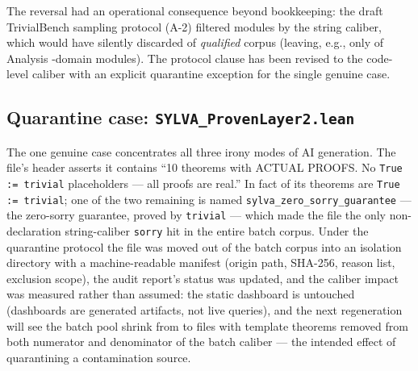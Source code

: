 The reversal had an operational consequence beyond bookkeeping: the
draft TrivialBench sampling protocol (A-2) filtered modules by the
string caliber, which would have silently discarded  of
\emph{qualified} corpus (leaving, e.g., only  of Analysis
-domain modules).
The protocol clause has been revised to the code-level caliber with
an explicit quarantine exception for the single genuine case.

\subsection{Quarantine case: \texttt{SYLVA\_ProvenLayer2.lean}}
\label{sec:quarantine}
The one genuine case concentrates all three irony modes of AI
generation. The file's header asserts it contains ``10 theorems with
ACTUAL PROOFS. No \texttt{True := trivial} placeholders --- all proofs
are real.'' In fact  of its  theorems are
\texttt{True := trivial}; one of the two remaining is named
\texttt{sylva\_zero\_sorry\_guarantee} --- the zero-sorry guarantee,
proved by \texttt{trivial} --- which made the file the only
non-declaration string-caliber \texttt{sorry} hit in the entire batch
corpus. Under the quarantine protocol the file was moved out of the
batch corpus into an isolation directory with a machine-readable
manifest (origin path, SHA-256, reason list, exclusion scope), the
audit report's status was updated, and the caliber impact was
measured rather than assumed: the static dashboard is untouched
(dashboards are generated artifacts, not live queries), and the next
regeneration will see the batch pool shrink from  to
 files with  template theorems removed from
both numerator and denominator of the batch caliber --- the intended
effect of quarantining a contamination source.

